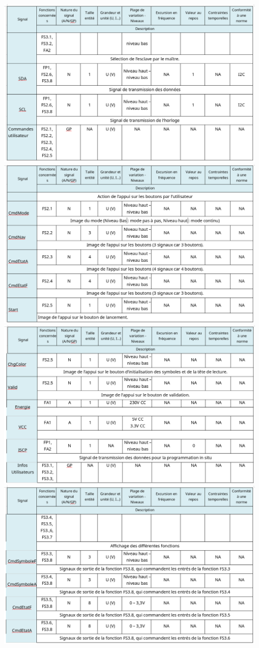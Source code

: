 \documentclass[12pt]{report}
\begin{document}
	\includegraphics[width=\textwidth]{img/s2}
	\includegraphics[width=\textwidth]{img/s3}
	\includegraphics[width=\textwidth]{img/s4}
	\includegraphics[width=\textwidth]{img/s5}
\end{document}
